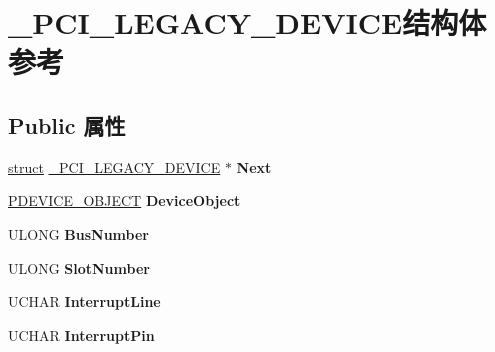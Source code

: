 \hypertarget{struct___p_c_i___l_e_g_a_c_y___d_e_v_i_c_e}{}\section{\+\_\+\+P\+C\+I\+\_\+\+L\+E\+G\+A\+C\+Y\+\_\+\+D\+E\+V\+I\+C\+E结构体 参考}
\label{struct___p_c_i___l_e_g_a_c_y___d_e_v_i_c_e}
\subsection*{Public 属性}
\begin{DoxyCompactItemize}
\item 
\mbox{\label{struct___p_c_i___l_e_g_a_c_y___d_e_v_i_c_e_aa35e44b80943bf2279e9e4a26f692e05}} 
\hyperlink{interfacestruct}{struct} \hyperlink{struct___p_c_i___l_e_g_a_c_y___d_e_v_i_c_e}{\+\_\+\+P\+C\+I\+\_\+\+L\+E\+G\+A\+C\+Y\+\_\+\+D\+E\+V\+I\+CE} $\ast$ {\bfseries Next}
\item 
\mbox{\label{struct___p_c_i___l_e_g_a_c_y___d_e_v_i_c_e_a9863cc93280a7d8478ad690a17e649bb}} 
\hyperlink{struct___d_e_v_i_c_e___o_b_j_e_c_t}{P\+D\+E\+V\+I\+C\+E\+\_\+\+O\+B\+J\+E\+CT} {\bfseries Device\+Object}
\item 
\mbox{\label{struct___p_c_i___l_e_g_a_c_y___d_e_v_i_c_e_ad6db078350d9e9376041ee23e990c143}} 
U\+L\+O\+NG {\bfseries Bus\+Number}
\item 
\mbox{\label{struct___p_c_i___l_e_g_a_c_y___d_e_v_i_c_e_ae5263934423aca67b16202e8f13b4506}} 
U\+L\+O\+NG {\bfseries Slot\+Number}
\item 
\mbox{\label{struct___p_c_i___l_e_g_a_c_y___d_e_v_i_c_e_a5f2ea3d8b3c7beacdb16ebed2afc2f05}} 
U\+C\+H\+AR {\bfseries Interrupt\+Line}
\item 
\mbox{\label{struct___p_c_i___l_e_g_a_c_y___d_e_v_i_c_e_a17922dddf2150d6fa5f9812bdf66ca29}} 
U\+C\+H\+AR {\bfseries Interrupt\+Pin}
\item 

\end{DoxyCompactItemize}
